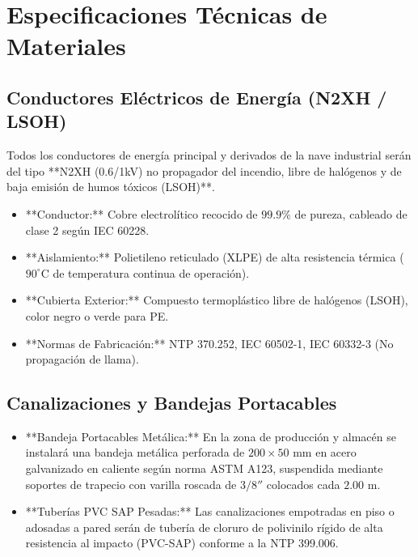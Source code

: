 \chapter{Especificaciones Técnicas de Materiales}

\section{Conductores Eléctricos de Energía (N2XH / LSOH)}
Todos los conductores de energía principal y derivados de la nave industrial serán del tipo **N2XH (0.6/1kV) no propagador del incendio, libre de halógenos y de baja emisión de humos tóxicos (LSOH)**.
\begin{itemize}
    \item **Conductor:** Cobre electrolítico recocido de $99.9\%$ de pureza, cableado de clase 2 según IEC 60228.
    \item **Aislamiento:** Polietileno reticulado (XLPE) de alta resistencia térmica ($90^\circ\text{C}$ de temperatura continua de operación).
    \item **Cubierta Exterior:** Compuesto termoplástico libre de halógenos (LSOH), color negro o verde para PE.
    \item **Normas de Fabricación:** NTP 370.252, IEC 60502-1, IEC 60332-3 (No propagación de llama).
\end{itemize}

\section{Canalizaciones y Bandejas Portacables}
\begin{itemize}
    \item **Bandeja Portacables Metálica:** En la zona de producción y almacén se instalará una bandeja metálica perforada de $200 \times 50\text{ mm}$ en acero galvanizado en caliente según norma ASTM A123, suspendida mediante soportes de trapecio con varilla roscada de $3/8''$ colocados cada $2.00\text{ m}$.
    \item **Tuberías PVC SAP Pesadas:** Las canalizaciones empotradas en piso o adosadas a pared serán de tubería de cloruro de polivinilo rígido de alta resistencia al impacto (PVC-SAP) conforme a la NTP 399.006.
\end{itemize}


